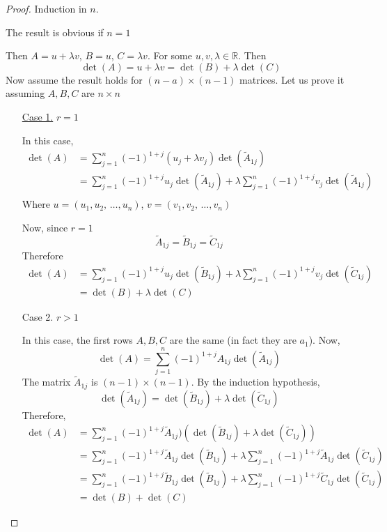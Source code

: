 \documentclass[12pt]{report}
\begin{document}
    \begin{proof}
        Induction in \(n\).

        The result is obvious if \(n = 1\)

        Then \(A = u +\lambda v\), \(B = u\), \(C = \lambda v\). For some \(u,v, \lambda \in \mathbb{R}\). Then
        \[\det(A) = u + \lambda v = \det(B) + \lambda \det(C)\]
        Now assume the result holds for \((n-a)\times (n-1)\) matrices. Let us prove it assuming \(A,B,C\) are \(n \times n\)
        \begin{enumerate}
            \item[\underline{Case 1.}]
                \(r = 1\)

                In this case,
                \begin{align*}
                    \det (A) &= \sum^n_{j=1} (-1)^{1+j} (u_j + \lambda v_j) \det (\widetilde{A}_{1j})\\
                    &=\sum^n_{j=1} (-1)^{1+j} u_j \det (\widetilde{A}_{1j}) + \lambda \sum^n_{j=1} (-1)^{1+j} v_j \det (\widetilde{A}_{1j})\\
                \end{align*}
                Where \(u = (u_1, u_2, \, \dots, u_n)\), \(v = (v_1, v_2, \, \dots, v_n)\)

                Now, since \(r=1\)
                \[\widetilde{A}_{1j} = \widetilde{B}_{1j} = \widetilde{C}_{1j}\]
                Therefore
                \begin{align*}
                    \det(A) &= \sum^n_{j=1} (-1)^{1+j} u_j \det (\widetilde{B}_{1j}) + \lambda \sum^n_{j=1} (-1)^{1+j} v_j \det (\widetilde{C}_{1j})\\
                    &= \det(B) + \lambda \det (C)
                \end{align*}
            \item[Case 2.]
                \(r>1\)

                In this case, the first rows \(A,B,C\) are the same (in fact they are \(a_1\)). Now,
                \[\det(A) = \sum^n_{j=1} (-1)^{1+j} A_{1j} \det (\widetilde{A}_{1j})\]
                The matrix \(\widetilde{A}_{1j}\) is \((n-1) \times (n-1)\). By the induction hypothesis,
                \[\det(\widetilde{A}_{1j}) = \det(\widetilde{B}_{1j}) + \lambda \det(\widetilde{C}_{1j})\]
                Therefore,
                \begin{align*}
                    \det(A) &= \sum^n_{j=1} (-1)^{1+j} \widetilde{A}_{1j}) \left(\det(\widetilde{B}_{1j}) + \lambda \det(\widetilde{C}_{1j})\right)\\
                    &= \sum^n_{j=1} (-1)^{1+j} \widetilde{A}_{1j} \det(\widetilde{B}_{1j}) + \lambda \sum^n_{j=1} (-1)^{1+j} \widetilde{A}_{1j} \det(\widetilde{C}_{1j})\\
                    &= \sum^n_{j=1} (-1)^{1+j} \widetilde{B}_{1j} \det(\widetilde{B}_{1j}) + \lambda \sum^n_{j=1} (-1)^{1+j} \widetilde{C}_{1j} \det(\widetilde{C}_{1j})\\
                    &= \det(B) + \det(C)
                \end{align*}
        \end{enumerate}
    \end{proof}
\end{document}
